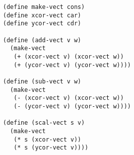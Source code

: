 \documentclass[a4paper,12pt]{article}
\begin{document}
\begin{lstlisting}
(define make-vect cons)
(define xcor-vect car)
(define ycor-vect cdr)

(define (add-vect v w)
  (make-vect
   (+ (xcor-vect v) (xcor-vect w))
   (+ (ycor-vect v) (ycor-vect w))))

(define (sub-vect v w)
  (make-vect
   (- (xcor-vect v) (xcor-vect w))
   (- (ycor-vect v) (ycor-vect w))))

(define (scal-vect s v)
  (make-vect
   (* s (xcor-vect v))
   (* s (ycor-vect v))))
\end{lstlisting}
\end{document}
